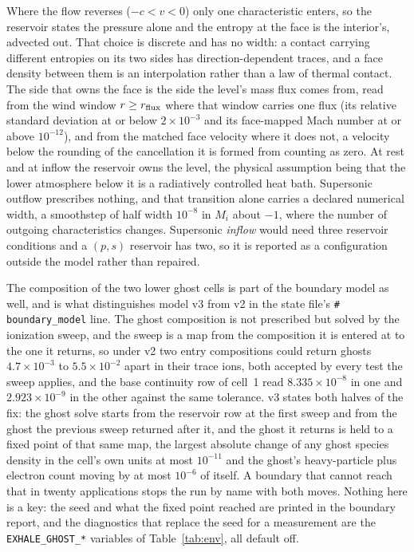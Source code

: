 \documentclass[english,a4paper]{my_memo}
\begin{document}
Where the flow reverses ($-c<v<0$) only one characteristic enters, so the
reservoir states the pressure alone and the entropy at the face is the
interior's, advected out. That choice is discrete and has no width: a contact
carrying different entropies on its two sides has direction-dependent traces,
and a face density between them is an interpolation rather than a law of
thermal contact. The side that owns the face is the side the level's mass flux
comes from, read from the wind window $r\ge r_{\rm flux}$ where that window
carries one flux (its relative standard deviation at or below
$2\times10^{-3}$ and its face-mapped Mach number at or above $10^{-12}$), and
from the matched face velocity where it does not, a velocity below the
rounding of the cancellation it is formed from counting as zero. At rest and
at inflow the reservoir owns the level, the physical assumption being that the
lower atmosphere below it is a radiatively controlled heat bath. Supersonic
outflow prescribes nothing, and that transition alone carries a declared
numerical width, a smoothstep of half width $10^{-8}$ in $M_i$ about $-1$,
where the number of outgoing characteristics changes. Supersonic \emph{inflow}
would need three reservoir conditions and a $(p,s)$ reservoir has two, so it is
reported as a configuration outside the model rather than repaired.

The composition of the two lower ghost cells is part of the boundary model as
well, and is what distinguishes model v3 from v2 in the state file's
\texttt{\# boundary\_model} line. The ghost composition is not prescribed but
solved by the ionization sweep, and the sweep is a map from the composition it
is entered at to the one it returns, so under v2 two entry compositions could
return ghosts $4.7\times10^{-3}$ to $5.5\times10^{-2}$ apart in their trace
ions, both accepted by every test the sweep applies, and the base continuity
row of cell~1 read $8.335\times10^{-8}$ in one and $2.923\times10^{-9}$ in
the other against the same tolerance. v3 states both halves of the fix: the
ghost solve starts from the reservoir row at the first sweep and from the
ghost the previous sweep returned after it, and the ghost it returns is held
to a fixed point of that same map, the largest absolute change of any ghost
species density in the cell's own units at most $10^{-11}$ and the ghost's
heavy-particle plus electron count moving by at most $10^{-6}$ of itself. A
boundary that cannot reach that in twenty applications stops the run by name
with both moves. Nothing here is a key: the seed and what the fixed point
reached are printed in the boundary report, and the diagnostics that replace
the seed for a measurement are the \texttt{EXHALE\_GHOST\_*} variables of
Table~\ref{tab:env}, all default off.
\end{document}
